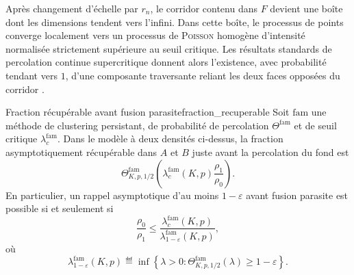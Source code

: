 \begin{Preuve}
Après changement d'échelle par $r_n$, le corridor contenu dans $F$ devient une boîte dont les dimensions tendent vers l'infini. Dans cette boîte, le processus de points converge localement vers un processus de \textsc{Poisson} homogène d'intensité normalisée strictement supérieure au seuil critique. Les résultats standards de percolation continue supercritique donnent alors l'existence, avec probabilité tendant vers $1$, d'une composante traversante reliant les deux faces opposées du corridor \cite{MeesterRoy, penrose2003}.

\end{Preuve}

\begin{Theoreme}{Fraction récupérable avant fusion parasite}{fraction_recuperable}
Soit $\mathrm{fam}$ une méthode de clustering persistant, de probabilité de percolation $\Theta^{\mathrm{fam}}$ et de seuil critique $\lambda_c^{\mathrm{fam}}$. Dans le modèle à deux densités ci-dessus, la fraction asymptotiquement récupérable dans $A$ et $B$ juste avant la percolation du fond est
\[
\boxed{
    \Theta^{\mathrm{fam}}_{K,p,1/2}\left(
        \lambda_c^{\mathrm{fam}}(K,p)\frac{\rho_1}{\rho_0}
    \right).
    }
\]
En particulier, un rappel asymptotique d'au moins $1-\varepsilon$ avant fusion parasite est possible si et seulement si
\[
\boxed{
    \frac{\rho_0}{\rho_1}
    \le
    \frac{\lambda_c^{\mathrm{fam}}(K,p)}
         {\lambda^{\mathrm{fam}}_{1-\varepsilon}(K,p)},
         }
\]
où
\[
    \lambda^{\mathrm{fam}}_{1-\varepsilon}(K,p)
    \eqdef
    \inf\left\{\lambda>0:
    \Theta^{\mathrm{fam}}_{K,p,1/2}(\lambda)\ge 1-\varepsilon
    \right\}.
\]
\end{Theoreme}

